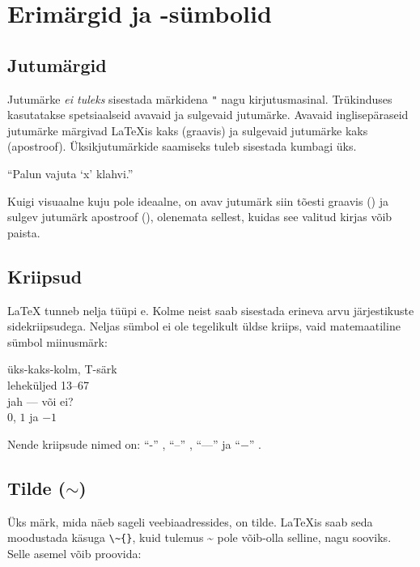 \section{Erimärgid ja -sümbolid}

\subsection{Jutumärgid}

Jutumärke \emph{ei tuleks}
sisestada märkidena \verb|"| nagu kirjutusmasinal. Trükinduses
kasutatakse spetsiaalseid avavaid ja sulgevaid jutumärke. Avavaid
inglisepäraseid jutumärke märgivad \LaTeX is kaks \textasciigrave{}
(graavis) ja sulgevaid jutumärke kaks \textquotesingle{} (apostroof).
Üksikjutumärkide saamiseks tuleb sisestada kumbagi üks.
\begin{example}
``Palun vajuta `x' klahvi.''
\end{example}
Kuigi visuaalne kuju pole ideaalne, on avav jutumärk siin tõesti graavis
(\textasciigrave) ja sulgev jutumärk apostroof (\textquotesingle),
olenemata sellest, kuidas see valitud kirjas võib paista.

\subsection{Kriipsud}

\LaTeX{} tunneb nelja tüüpi e. Kolme neist saab sisestada
erineva arvu järjestikuste sidekriipsudega. Neljas sümbol ei ole
tegelikult üldse kriips, vaid matemaatiline sümbol miinusmärk:

\begin{example}
üks-kaks-kolm, T-särk\\
leheküljed 13--67\\
jah --- või ei? \\
$0$, $1$ ja $-1$
\end{example}
Nende kriipsude nimed on: \index{-}"`-"' ,
"`--"' , "`---"' 
ja "`$-$"' .

\subsection{Tilde ($\sim$)}
Üks märk, mida näeb sageli veebiaadressides, on tilde. \LaTeX is saab
seda moodustada käsuga \verb|\~{}|, kuid tulemus \~{} pole
võib-olla selline, nagu sooviks. Selle asemel võib proovida:

